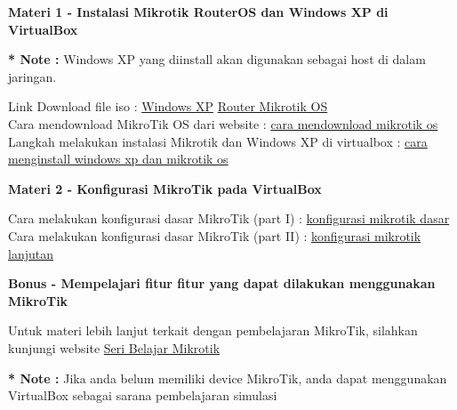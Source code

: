 \documentclass{article}
\begin{document}
    \begin{flushleft}
        \textbf{Materi 1 - Instalasi Mikrotik RouterOS dan Windows XP di VirtualBox}

        \begin{center}
            \footnotesize\textbf{* Note :} Windows XP yang diinstall akan digunakan 
            sebagai host di dalam jaringan.\\
        \end{center}

        Link Download file iso : 
        \href{https://www.microsoft.com/en-us/Download/confirmation.aspx?id=18242}{Windows XP} \;
        \href{https://mikrotik.com/download/archive}{Router Mikrotik OS} \\

        Cara mendownload MikroTik OS dari website :
        \href{https://www.youtube.com/watch?v=OMsGPKRLabM}{cara mendownload mikrotik os}\\

        Langkah melakukan instalasi Mikrotik dan Windows XP di virtualbox :
        \href{https://www.youtube.com/watch?v=LlmNKEuiWvk&list=PLvT7-AKYOYMxXuwYv1uA9e0aDsX1XgF4l&index=2}{cara menginstall windows xp dan mikrotik os}\\

    \end{flushleft}

    \begin{flushleft}
        \textbf{Materi 2 - Konfigurasi MikroTik pada VirtualBox}
        \newline

        Cara melakukan konfigurasi dasar MikroTik (part I) : \href{https://www.youtube.com/watch?v=qNhfV5cta50&list=PLvT7-AKYOYMxXuwYv1uA9e0aDsX1XgF4l}{konfigurasi mikrotik dasar}\\
        Cara melakukan konfigurasi dasar MikroTik (part II) : \href{https://www.youtube.com/watch?v=3yU42r7QvSU&list=PLvT7-AKYOYMxXuwYv1uA9e0aDsX1XgF4l&index=3}{konfigurasi mikrotik lanjutan}\\

    \end{flushleft}

    \begin{flushleft}
        \textbf{Bonus - Mempelajari fitur fitur yang dapat dilakukan menggunakan MikroTik}
        \newline

        Untuk materi lebih lanjut terkait dengan pembelajaran MikroTik, silahkan kunjungi website 
        \href{https://www.youtube.com/playlist?list=PLvT7-AKYOYMxXuwYv1uA9e0aDsX1XgF4l}{Seri Belajar Mikrotik}\\

        \begin{center}
            \footnotesize\textbf{* Note :} Jika anda belum memiliki device MikroTik, anda dapat 
            menggunakan VirtualBox sebagai sarana pembelajaran simulasi\\
        \end{center}

    \end{flushleft}
\end{document}
